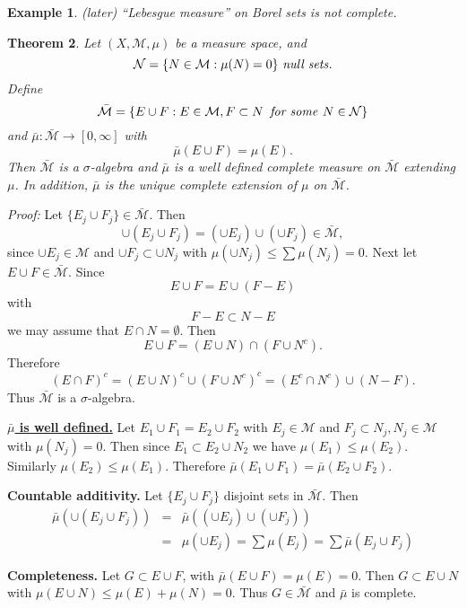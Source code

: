 \documentclass[12pt]{report}
\newtheorem{theorem}{Theorem}[section]
\newtheorem{example}[theorem]{Example}
\begin{document}
\begin{example} (later) ``Lebesgue measure'' on Borel sets is not
complete.
\end{example}
\begin{theorem}  Let $(X, \mathcal{M}, \mu)$ be  a measure space, and
\[
\mathcal{N} = \{N \in \mathcal{M}: \mu(N) = 0\} \mbox{ \textit{null sets}}.
\] Define
\[
\bar{\mathcal{M}} = \{E \cup F: E \in \mathcal{M}, F \subset N\,
\mbox{\textit{  for some }} N \in \mathcal{N}\}
\] and
$
\bar{\mu}: \bar{\mathcal{M}} \longrightarrow [0, \infty]
$ 
with
\[
\bar \mu(E \cup F) = \mu(E).
\] Then $\bar{ \mathcal{M}}$ is a $\sigma$-algebra and $\bar \mu$ is a well
defined complete measure on $\bar{\mathcal{M}}$ extending $\mu$.  In
addition, $\bar \mu$ is the unique complete extension of $\mu$ on 
$\bar{\mathcal{M}}$.
\end{theorem}
\textit{Proof:}  Let $\{E_j \cup F_j \} \in \bar{\mathcal{M}}$.  Then
\[
\cup(E_j \cup F_j) = (\cup E_j) \cup (\cup F_j) \in \bar{\mathcal{M}},
\] since $\cup E_j \in \mathcal{M}$ and $\cup F_j \subset \cup N_j$ with
$\mu(\cup N_j) \le \sum \mu(N_j) = 0.$
  Next let $E \cup F \in \bar{\mathcal{M}}$.  Since
\[ E \cup F = E \cup (F -E)
\] with
\[ F - E \subset N - E
\] we may assume that $E \cap N = \emptyset$.  Then
\[ E \cup F = (E \cup N) \cap (F \cup N^c).
\] Therefore
\[ (E \cap F)^c = (E \cup N)^c \cup (F \cup N^c)^c = (E^c \cap N^c) \cup (N -
F).
\] Thus $\bar{\mathcal{M}}$ is a $\sigma$-algebra.


\bigskip
\noindent
\underline{{\bf  $\bar \mu$ is well defined.}}  Let $E_1 \cup F_1 = E_2
\cup F_2$ with $E_j \in \mathcal{M}$ and $F_j \subset N_j, N_j
\in \mathcal{M}$ with $\mu(N_j)=0$.  Then since $E_1 \subset E_2 \cup
N_2$ we have $\mu(E_1) \le \mu(E_2)$.  Similarly
$\mu(E_2) \le \mu(E_1)$.  Therefore $\bar \mu(E_1 \cup F_1) = \bar
\mu(E_2 \cup F_2).$

\bigskip
\noindent
{\bf Countable additivity.}  Let $\{E_j \cup F_j\}$ disjoint sets in 
$\bar{\mathcal{M}}$.  Then
\begin{eqnarray*}
\bar \mu(\cup (E_j \cup F_j)) &=& \bar \mu((\cup E_j) \cup (\cup F_j))\\
&=& \mu(\cup E_j) = \sum \mu(E_j) = \sum \bar\mu(E_j \cup F_j)
\end{eqnarray*}

\bigskip
\noindent
{\bf Completeness.}  Let $G \subset E \cup F$, with $\bar \mu(E
\cup F) = \mu(E)=0$.  Then $G \subset E \cup N$ with
$\mu(E\cup N) \le \mu(E) + \mu(N) = 0$.  Thus  
$G \in \bar{\mathcal{M}}$ and $\bar \mu$ is complete.
\end{document}
